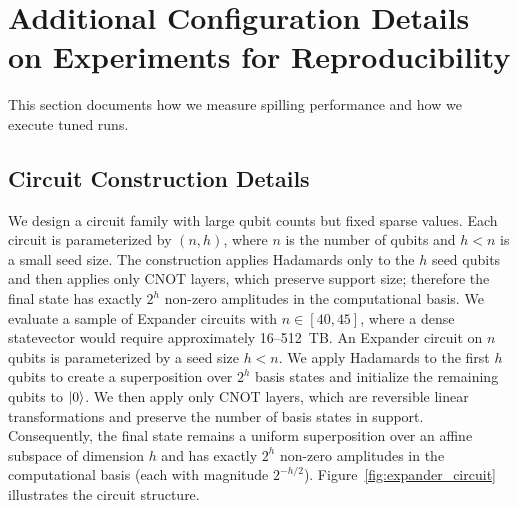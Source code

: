 

 

\section{Additional Configuration Details on Experiments for Reproducibility}
\label{app:tuning-repro}

This section documents how we measure spilling performance and how we execute tuned runs.

\subsection{Circuit Construction Details}
\label{app:expander-details}
We design a circuit family with large qubit
counts but fixed sparse values.
Each circuit is parameterized by $(n,h)$, where $n$
is the number of qubits and $h<n$ is a small seed size. The construction applies Hadamards
only to the $h$ seed qubits and then applies only CNOT layers, which preserve support
size; therefore the final state has exactly $2^h$ non-zero amplitudes in the computational
basis. We
evaluate a sample of Expander circuits with $n \in [40,45]$, where a dense statevector
would require approximately 16--512~TB.  
An Expander circuit on $n$ qubits is parameterized by a seed size $h<n$. We apply
Hadamards to the first $h$ qubits to create a superposition over $2^h$ basis states and
initialize the remaining qubits to $\ket{0}$. We then apply only CNOT layers, which are
reversible linear transformations and preserve the number of basis states in support.
Consequently, the final state remains a uniform superposition over an affine subspace of
dimension $h$ and has exactly $2^h$ non-zero amplitudes in the computational basis (each
with magnitude $2^{-h/2}$). Figure~\ref{fig:expander_circuit} illustrates the circuit
structure.

